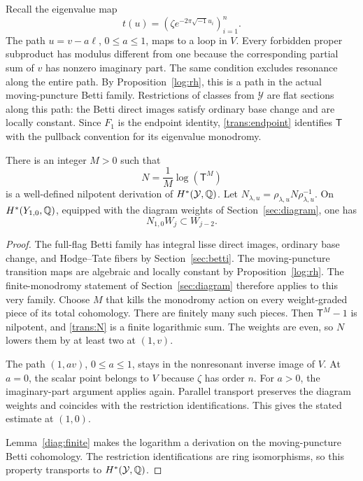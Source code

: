 Recall the eigenvalue map
\[
t(u)=(\zeta e^{-2\pi\sqrt{-1}u_i})_{i=1}^n.
\]
The path $u=v-a\ell$, $0\le a\le1$, maps to a loop in $V$. Every forbidden proper subproduct has modulus different from one because the corresponding partial sum of $v$ has nonzero imaginary part. The same condition excludes resonance along the entire path. By Proposition~\ref{log:rh}, this is a path in the actual moving-puncture Betti family. Restrictions of classes from $\mathcal Y$ are flat sections along this path: the Betti direct images satisfy ordinary base change and are locally constant. Since $F_1$ is the endpoint identity, \eqref{trans:endpoint} identifies $\mathsf T$ with the pullback convention for its eigenvalue monodromy.

\begin{lemma}\label{trans:logarithm}
There is an integer $M>0$ such that
\begin{equation}\label{trans:N}
N=\frac1M\log(\mathsf T^M)
\end{equation}
is a well-defined nilpotent derivation of $H^*(\mathcal Y,\mathbb Q)$. Let
$N_{\lambda,u}=\rho_{\lambda,u}N\rho_{\lambda,u}^{-1}$.
On $H^*(Y_{1,0},\mathbb Q)$, equipped with the diagram weights of Section~\ref{sec:diagram}, one has
\[
N_{1,0}W_j\subset W_{j-2}.
\]
\end{lemma}

\begin{proof}
The full-flag Betti family has integral lisse direct images, ordinary base change, and Hodge--Tate fibers by Section~\ref{sec:betti}. The moving-puncture transition maps are algebraic and locally constant by Proposition~\ref{log:rh}. The finite-monodromy statement of Section~\ref{sec:diagram} therefore applies to this very family. Choose $M$ that kills the monodromy action on every weight-graded piece of its total cohomology. There are finitely many such pieces. Then $\mathsf T^M-1$ is nilpotent, and \eqref{trans:N} is a finite logarithmic sum. The weights are even, so $N$ lowers them by at least two at $(1,v)$.

The path $(1,av)$, $0\le a\le1$, stays in the nonresonant inverse image of $V$. At $a=0$, the scalar point belongs to $V$ because $\zeta$ has order $n$. For $a>0$, the imaginary-part argument applies again. Parallel transport preserves the diagram weights and coincides with the restriction identifications. This gives the stated estimate at $(1,0)$.

Lemma~\ref{diag:finite} makes the logarithm a derivation on the moving-puncture Betti cohomology. The restriction identifications are ring isomorphisms, so this property transports to $H^*(\mathcal Y,\mathbb Q)$.
\end{proof}

